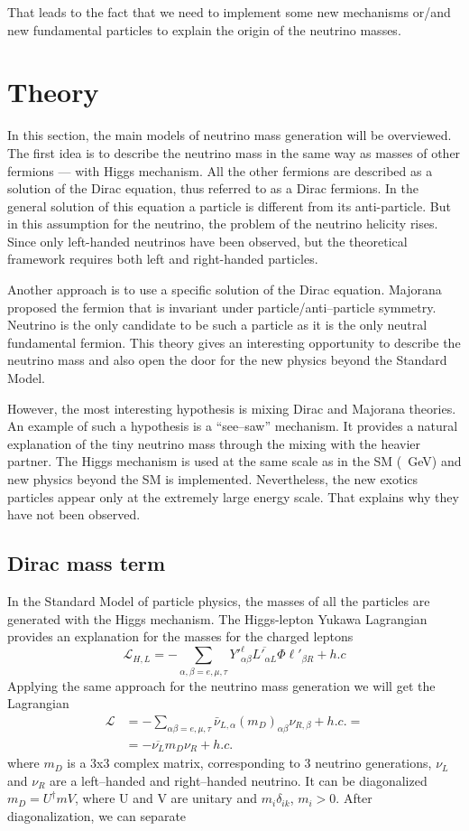 \documentclass[../main.tex]{subfiles}
\begin{document}
That leads to the fact that we need to implement some new mechanisms or/and new fundamental particles to explain the origin of the neutrino masses.

\section{Theory}
In this section, the main models of neutrino mass generation will be overviewed. The first idea is to describe the neutrino mass in the same way as masses of other fermions --- with Higgs mechanism. All the other fermions are described as a solution of the Dirac equation, thus referred to as a Dirac fermions. In the general solution of this equation a particle is different from its anti-particle. But in this assumption for the neutrino, the problem of the neutrino helicity rises. Since only left-handed neutrinos have been observed, but the theoretical framework requires both left and right-handed particles.

Another approach is to use a specific solution of the Dirac equation. Majorana proposed the fermion that is invariant under particle/anti--particle symmetry. Neutrino is the only candidate to be such a particle as it is the only neutral fundamental fermion. This theory gives an interesting opportunity to describe the neutrino mass and also open the door for the new physics beyond the Standard Model.

However, the most interesting hypothesis is mixing Dirac and Majorana theories. An example of such a hypothesis is a ``see--saw'' mechanism. It provides a natural explanation of the tiny neutrino mass through the mixing with the heavier partner. The Higgs mechanism is used at the same scale as in the SM (~GeV) and new physics beyond the SM is implemented. Nevertheless, the new exotics particles appear only at the extremely large energy scale. That explains why they have not been observed.

\subsection{Dirac mass term}
In the Standard Model of particle physics, the masses of all the particles are generated with the Higgs mechanism. The Higgs-lepton Yukawa Lagrangian provides an explanation for the masses for the charged leptons
\begin{equation}
\mathcal{L}_{H, L}=-\sum_{\alpha, \beta=e,\mu,\tau}Y'^\ell_{\alpha\beta}\overline{L'_{\alpha L}}\Phi\ell'_{\beta R}+h.c
\end{equation}
Applying the same approach for the neutrino mass generation we will get the Lagrangian
\begin{align}
\mathcal{L}&=-\sum_{\alpha\beta=e,\mu,\tau}\bar{\nu}_{L,\alpha}(m_D)_{\alpha\beta}\nu_{R,\beta}+h.c. =\nonumber \\
&=-\overline{\nu_L}m_D\nu_R+h.c.
\end{align}
where $m_D$ is a 3x3 complex matrix, corresponding to 3 neutrino generations, $\nu_L$ and $\nu_R$ are a left--handed and right--handed neutrino. It can be diagonalized $m_D=U^\dag m V$, where U and V are unitary and $m_i\delta_{ik}$, $m_i>0$. After diagonalization, we can separate
\end{document}
